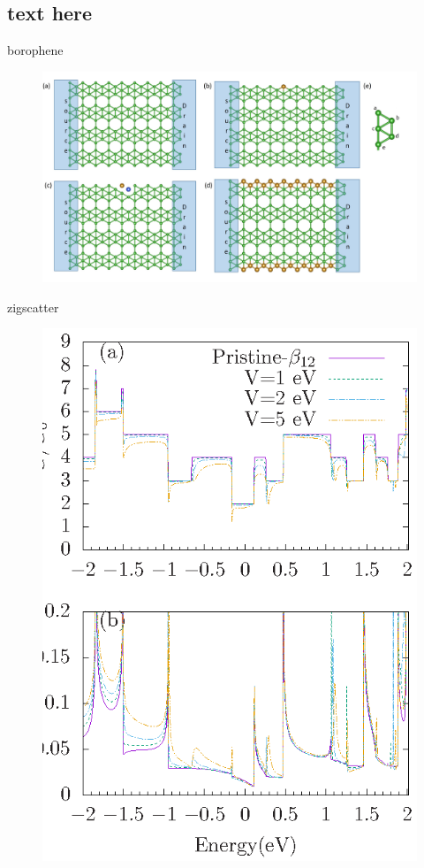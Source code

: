 \documentclass[handout,t]{beamer}
\begin{document}
\subsection{text here}
\begin{frame}{borophene}
	\begin{figure}[!ht]
		\centering
		  \includegraphics[width=0.8\linewidth]{../figures/borophene_structure(3).JPG}
		 \label{fig:borophene}
	  \end{figure}
\end{frame}

\begin{frame}{zigscatter}
	\begin{figure}[!h]
		\centering
		\includegraphics[width=0.5\linewidth]{../figures/zigscatter-thesis.eps}
		\label{zigscatter}
	  \end{figure}
\end{frame}
\end{document}
